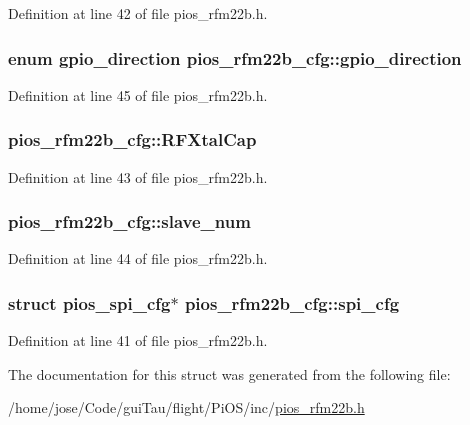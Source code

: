 Definition at line 42 of file pios\-\_\-rfm22b.\-h.

\hypertarget{structpios__rfm22b__cfg_ac8a55d600d26585b2fb4d58c4e197f9b}{
\subsubsection[{gpio\-\_\-direction}]{\setlength{\rightskip}{0pt plus 5cm}enum {\bf gpio\-\_\-direction} pios\-\_\-rfm22b\-\_\-cfg\-::gpio\-\_\-direction}}\label{structpios__rfm22b__cfg_ac8a55d600d26585b2fb4d58c4e197f9b}


Definition at line 45 of file pios\-\_\-rfm22b.\-h.

\hypertarget{structpios__rfm22b__cfg_a20784354b27515bed19c3fa02b880a10}{
\subsubsection[{R\-F\-Xtal\-Cap}]{ pios\-\_\-rfm22b\-\_\-cfg\-::\-R\-F\-Xtal\-Cap}}\label{structpios__rfm22b__cfg_a20784354b27515bed19c3fa02b880a10}


Definition at line 43 of file pios\-\_\-rfm22b.\-h.

\hypertarget{structpios__rfm22b__cfg_a71f36f077e13645e984cb88f10e2fa0e}{
\subsubsection[{slave\-\_\-num}]{ pios\-\_\-rfm22b\-\_\-cfg\-::slave\-\_\-num}}\label{structpios__rfm22b__cfg_a71f36f077e13645e984cb88f10e2fa0e}


Definition at line 44 of file pios\-\_\-rfm22b.\-h.

\hypertarget{structpios__rfm22b__cfg_aa6c10909092b21bbdec314781785bf5d}{
\subsubsection[{spi\-\_\-cfg}]{\setlength{\rightskip}{0pt plus 5cm}struct {\bf pios\-\_\-spi\-\_\-cfg}$\ast$ pios\-\_\-rfm22b\-\_\-cfg\-::spi\-\_\-cfg}}\label{structpios__rfm22b__cfg_aa6c10909092b21bbdec314781785bf5d}


Definition at line 41 of file pios\-\_\-rfm22b.\-h.



The documentation for this struct was generated from the following file\-:\begin{DoxyCompactItemize}
\item 
/home/jose/\-Code/gui\-Tau/flight/\-Pi\-O\-S/inc/\hyperlink{pios__rfm22b_8h}{pios\-\_\-rfm22b.\-h}\end{DoxyCompactItemize}
